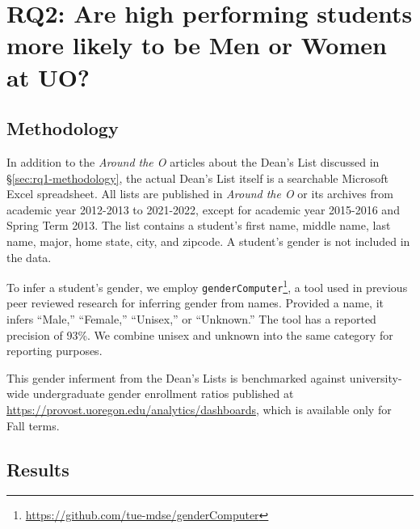 \documentclass[10]{article}
\begin{document}
\section{RQ2: Are high performing students more likely to be Men or Women at UO?}

\subsection{Methodology}

In addition to the \textit{Around the O} articles about the Dean's List discussed in \S\ref{sec:rq1-methodology}, the actual Dean's List itself is a searchable Microsoft Excel spreadsheet. All lists are published in \textit{Around the O} or its archives from academic year 2012-2013 to 2021-2022, except for academic year 2015-2016 and Spring Term 2013. The list contains a student's first name, middle name, last name, major, home state, city, and zipcode. A student's gender is not included in the data.

To infer a student's gender, we employ \texttt{genderComputer}\footnote{\url{https://github.com/tue-mdse/genderComputer}}, a tool used in previous peer reviewed research for inferring gender from names. Provided a name, it infers ``Male,'' ``Female,'' ``Unisex,'' or ``Unknown.'' The tool has a reported precision of 93\%. We combine unisex and unknown into the same category for reporting purposes.



This gender inferment from the Dean's Lists is benchmarked against university-wide undergraduate gender enrollment ratios published at \url{https://provost.uoregon.edu/analytics/dashboards}, which is available only for Fall terms.

\subsection{Results}
\end{document}
